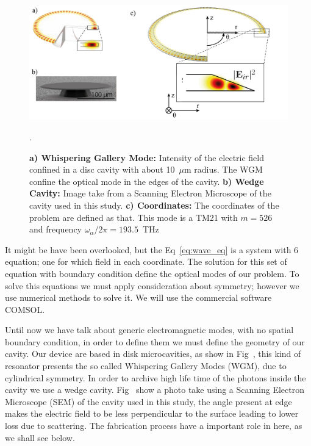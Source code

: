 \begin{figure}[b!]
    \centering
    \includegraphics[width =16cm]{Dissertation_wgm.jpg}
    \caption{\textbf{a) Whispering Gallery Mode:} Intensity of the electric field confined in a disc cavity with about 10~$\mu$m radius. The WGM confine the optical mode in the edges of the cavity. \textbf{b) Wedge Cavity:} Image take from a Scanning Electron Microscope of the cavity used in this study. \textbf{c) Coordinates:} The coordinates of the problem are defined as that. This mode is a TM21 with $m = 526$ and frequency $\omega_\alpha/2\pi = 193.5$~THz}.
    \label{fig:wgm}
\end{figure}
It might be have been overlooked, but the Eq~\ref{eq:wave_eq} is a system with 6 equation; one for which field in each coordinate. The solution for this set of equation with boundary condition define the optical modes of our problem. To solve this equations we must apply consideration about symmetry; however we use numerical methods to solve it. We will use the commercial software COMSOL\regmark.

Until now we have talk about generic electromagnetic modes, with no spatial boundary condition, in order to define them we must define the geometry of our cavity. Our device are based in disk microcavities, as show in Fig~, this kind of resonator presents the so called Whispering Gallery Modes (WGM), due to cylindrical symmetry. In order to archive high life time of the photons inside the cavity we use a wedge cavity. Fig~ show a photo take using a Scanning Electron Microscope (SEM) of the cavity used in this study, the angle present at edge makes the electric field to be less perpendicular to the surface leading to lower loss due to scattering\needcit. The fabrication process have a important role in here, as we shall see below. 

